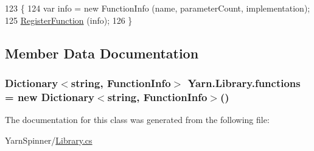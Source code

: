 \begin{DoxyCode}
123                                                                                                \{
124             var info = \textcolor{keyword}{new} FunctionInfo (name, parameterCount, implementation);
125             \hyperlink{a00101_a001ab29d21fe7db10fc9c250914287f9}{RegisterFunction} (info);
126         \}
\end{DoxyCode}


\subsection{Member Data Documentation}
\hypertarget{a00101_a2fcc78a63963be5320cf09783b66fab6}{
\subsubsection[{functions}]{\setlength{\rightskip}{0pt plus 5cm}Dictionary$<$string, {\bf Function\-Info}$>$ Yarn.\-Library.\-functions = new Dictionary$<$string, {\bf Function\-Info}$>$()\hspace{0.3cm}{\ttfamily [private]}}}\label{a00101_a2fcc78a63963be5320cf09783b66fab6}


The documentation for this class was generated from the following file\-:\begin{DoxyCompactItemize}
\item 
Yarn\-Spinner/\hyperlink{a00264}{Library.\-cs}\end{DoxyCompactItemize}
